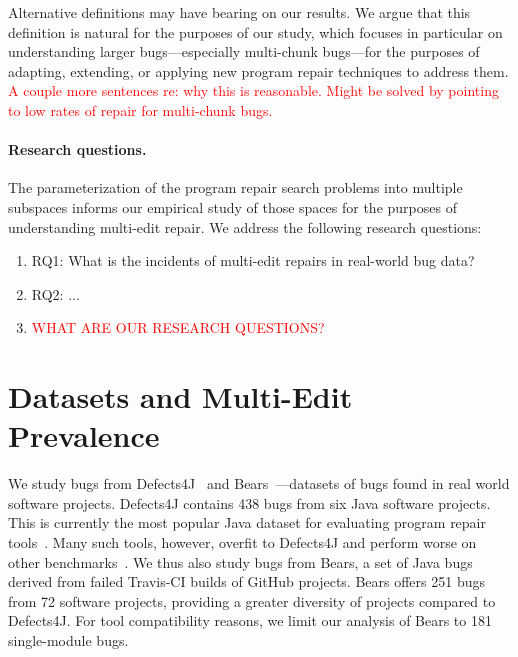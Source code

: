 \documentclass[sigconf, timestamp-false, anonymous=true]{acmart}
\newcommand\todo[1]{\textcolor{red}{#1}}
\begin{document}
Alternative definitions may have bearing on our results.  We argue that this
definition is natural for the purposes of our study, which focuses in particular
on understanding larger bugs---especially multi-chunk bugs---for the purposes of 
adapting, extending, or applying new program repair techniques to address them. 
\todo{A couple more sentences re: why this is reasonable. Might be solved by 
pointing to low rates of repair for multi-chunk bugs.}

\paragraph{Research questions.}  The parameterization of the program repair
search problems into multiple subspaces informs our empirical study of those
spaces for the purposes of understanding multi-edit repair.  We address the
following research questions:

\begin{enumerate}
\item RQ1: What is the incidents of multi-edit repairs in real-world bug data?
\item RQ2: ...
\item \todo{WHAT ARE OUR RESEARCH QUESTIONS?}
\end{enumerate}

\section{Datasets and Multi-Edit Prevalence}
\label{sec:data-rq1}

We study bugs from Defects4J~\cite{defects4j} and Bears~\cite{bears}---datasets of 
bugs found in real world software projects. Defects4J contains 438 bugs from six 
Java software projects. This is currently the most popular Java dataset for evaluating 
program repair tools~\cite{durieux-repair-them-all}.
Many such tools, however, overfit to Defects4J and perform worse on other 
benchmarks~\cite{durieux-repair-them-all}. 
We thus also study bugs from Bears, 
a set of Java bugs derived from failed Travis-CI builds of GitHub projects.
Bears offers 251 bugs from 72 software projects, providing a greater diversity of 
projects compared to Defects4J. For tool compatibility reasons, we limit 
our analysis of Bears to 181 single-module bugs. 
\end{document}
